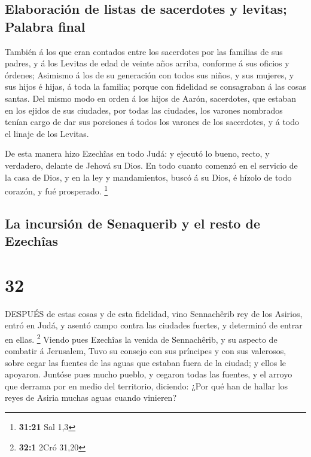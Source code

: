 \hypertarget{elaboraciuxf3n-de-listas-de-sacerdotes-y-levitas-palabra-final}{%
\subsection{Elaboración de listas de sacerdotes y levitas; Palabra
final}\label{elaboraciuxf3n-de-listas-de-sacerdotes-y-levitas-palabra-final}}

 También á los que eran contados entre los sacerdotes por
las familias de sus padres, y á los Levitas de edad de veinte años
arriba, conforme á sus oficios y órdenes;  Asimismo á los
de su generación con todos sus niños, y sus mujeres, y sus hijos é
hijas, á toda la familia; porque con fidelidad se consagraban á las
cosas santas.  Del mismo modo en orden á los hijos de
Aarón, sacerdotes, que estaban en los ejidos de sus ciudades, por todas
las ciudades, los varones nombrados tenían cargo de dar sus porciones á
todos los varones de los sacerdotes, y á todo el linaje de los Levitas.

 De esta manera hizo Ezechîas en todo Judá: y ejecutó lo
bueno, recto, y verdadero, delante de Jehová su Dios.  En
todo cuanto comenzó en el servicio de la casa de Dios, y en la ley y
mandamientos, buscó á su Dios, é hízolo de todo corazón, y fué
prosperado. \footnote{\textbf{31:21} Sal 1,3}

\hypertarget{la-incursiuxf3n-de-senaquerib-y-el-resto-de-ezechuxeeas}{%
\subsection{La incursión de Senaquerib y el resto de
Ezechîas}\label{la-incursiuxf3n-de-senaquerib-y-el-resto-de-ezechuxeeas}}

\hypertarget{section-31}{%
\section{32}\label{section-31}}

 DESPUÉS de estas cosas y de esta fidelidad, vino
Sennachêrib rey de los Asirios, entró en Judá, y asentó campo contra las
ciudades fuertes, y determinó de entrar en ellas. \footnote{\textbf{32:1}
  2Cró 31,20}  Viendo pues Ezechîas la venida de
Sennachêrib, y su aspecto de combatir á Jerusalem,  Tuvo su
consejo con sus príncipes y con sus valerosos, sobre cegar las fuentes
de las aguas que estaban fuera de la ciudad; y ellos le apoyaron.
 Juntóse pues mucho pueblo, y cegaron todas las fuentes, y
el arroyo que derrama por en medio del territorio, diciendo: ¿Por qué
han de hallar los reyes de Asiria muchas aguas cuando vinieren?

